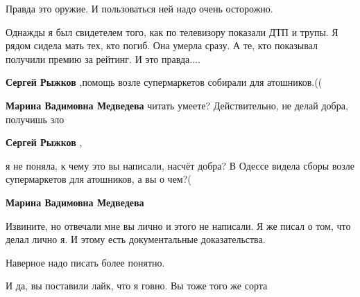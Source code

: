 \begin{itemize}
\begin{itemize}
Правда это оружие. И пользоваться ней надо очень осторожно.

Однажды я был свидетелем того, как по телевизору показали ДТП и трупы. Я рядом
сидела мать тех, кто погиб. Она умерла сразу. А те, кто показывал получили
премию за рейтинг. И это правда....

 
\textbf{Сергей Рыжков} ,помощь возле супермаркетов собирали для атошников.((

 
\textbf{Марина Вадимовна Медведева} читать умеете? Действительно, не делай добра, получишь зло

 
\textbf{Сергей Рыжков} ,

я не поняла, к чему это вы написали, насчёт добра? В Одессе видела сборы возле
супермаркетов для атошников, а вы о чем?(

 
\textbf{Марина Вадимовна Медведева} 

Извините, но отвечали мне вы лично и этого не написали. Я же писал о том, что
делал лично я. И этому есть документальные доказательства.

Наверное надо писать более понятно.

И да, вы поставили лайк, что я говно. Вы тоже того же сорта


 

\end{itemize}
\end{itemize}
